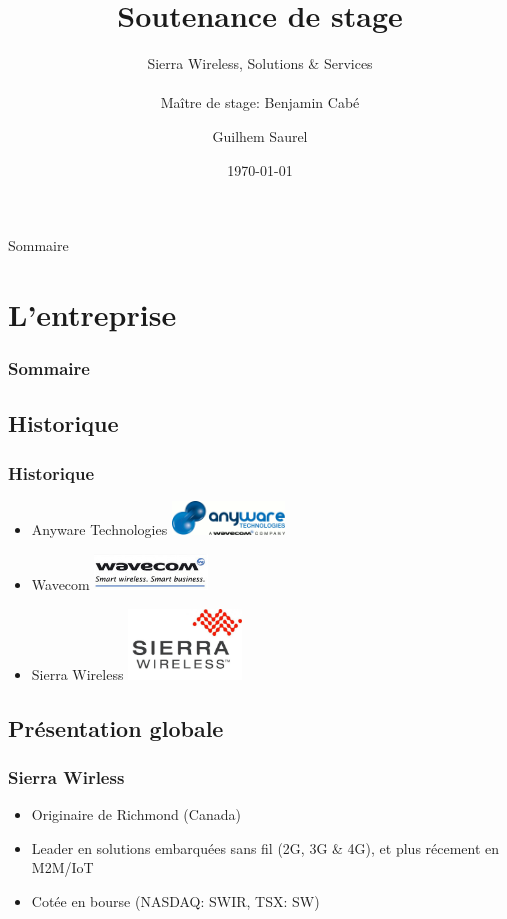 \documentclass[slidetop,11pt]{beamer}
\title{Soutenance de stage}
\subtitle{Sierra Wireless, Solutions \& Services \\ ~ \\ Maître de stage: Benjamin Cabé}
\author{Guilhem Saurel}
\institute{INP-ENSEEIHT}
\date{\today}
\begin{document}
\frame{\titlepage}

\begin{frame}{Sommaire}
    \small \tableofcontents
\end{frame}

\section{L’entreprise}

\begin{frame}
    \frametitle{Sommaire}
\end{frame}

\subsection{Historique}
\begin{frame}
    \frametitle{Historique}
    \begin{itemize}
        \item Anyware Technologies
            \includegraphics[width=3cm]{img/anyware-tech.png}
        \item Wavecom
            \includegraphics[width=3cm]{img/wavecom.jpg}
        \item Sierra Wireless
            \includegraphics[width=3cm]{img/swir.jpg}
    \end{itemize}
\end{frame}

\subsection{Présentation globale}
\begin{frame}
    \frametitle{Sierra Wirless}
    \begin{itemize}
        \item Originaire de Richmond (Canada)
        \item Leader en solutions embarquées sans fil (2G, 3G \& 4G), et plus récement en M2M/IoT
        \item Cotée en bourse (NASDAQ: SWIR, TSX: SW)
    \end{itemize}
\end{frame}
\end{document}
